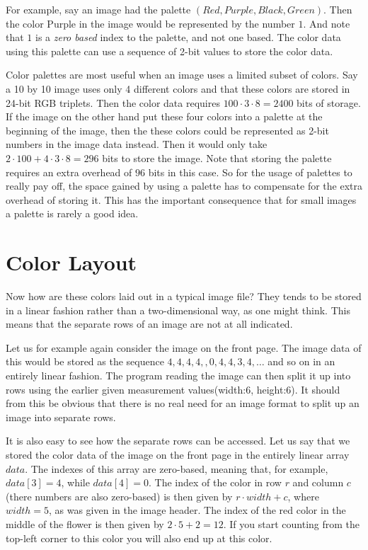 For example, say an image had the palette $(Red, Purple, Black,
Green)$. Then the color Purple in the image would be represented by
the number $1$. And note that $1$ is a \textit{zero based} index to
the palette, and not one based. The color data using this palette can
use a sequence of 2-bit values to store the color data.

Color palettes are most useful when an image uses a limited subset of
colors. Say a 10 by 10 image uses only 4 different colors and that
these colors are stored in 24-bit RGB triplets. Then the color data
requires $100 \cdot 3 \cdot 8 = 2400$ bits of storage. If the image on
the other hand put these four colors into a palette at the beginning
of the image, then the these colors could be represented as 2-bit
numbers in the image data instead. Then it would only take $2 \cdot
100 + 4 \cdot 3 \cdot 8 = 296$ bits to store the image. Note that
storing the palette requires an extra overhead of $96$ bits in this
case. So for the usage of palettes to really pay off, the space gained
by using a palette has to compensate for the extra overhead of storing
it. This has the important consequence that for small images a palette
is rarely a good idea.

\section{Color Layout}

Now how are these colors laid out in a typical image file? They tends
to be stored in a linear fashion rather than a two-dimensional way, as
one might think. This means that the separate rows of an image are not
at all indicated.

Let us for example again consider the image on the front page. The
image data of this would be stored as the sequence
$4,4,4,4,,0,4,4,3,4,\dots$ and so on in an entirely linear
fashion. The program reading the image can then split it up into rows
using the earlier given measurement values(width:$6$, height:$6$). It
should from this be obvious that there is no real need for an image
format to split up an image into separate rows.

It is also easy to see how the separate rows can be accessed. Let us
say that we stored the color data of the image on the front page in
the entirely linear array $data$. The indexes of this array are
zero-based, meaning that, for example, $data[3]=4$, while
$data[4]=0$. The index of the color in row $r$ and column $c$(there
numbers are also zero-based) is then given by $r \cdot width + c$,
where $width=5$, as was given in the image header. The index of the
red color in the middle of the flower is then given by $2 \cdot 5 + 2
= 12$. If you start counting from the top-left corner to this color
you will also end up at this color. 

